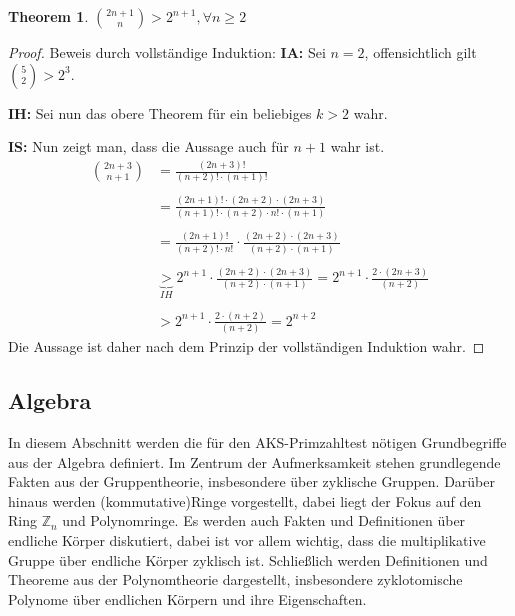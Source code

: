 \documentclass[12pt,oneside]{article}
\newtheorem{theorem}{Theorem}[section]
\theoremstyle{remark}
\theoremstyle{definition}
\begin{document}
\smallskip

\begin{theorem}\label{useful_theorem_for_proof}
${2n + 1 \choose n} > 2^{n+1}, \forall n \geq 2$
\end{theorem}

\begin{proof}
Beweis durch vollständige Induktion:\newline\newline
\textbf{IA: } Sei $n = 2$, offensichtlich gilt ${5 \choose 2} > 2^3$.\newline\newline

\textbf{IH: }Sei nun das obere Theorem für ein beliebiges $k > 2 $ wahr.

\textbf{IS: } Nun zeigt man, dass die Aussage auch für $n + 1$ wahr ist.
\begin{align*}
    {2n +3 \choose n + 1} &= \frac{(2n + 3)!}{(n + 2)! \cdot (n + 1)!} \\
    \\
    &= \frac{(2n + 1)! \cdot (2n + 2) \cdot (2n + 3)}{(n + 1)! \cdot (n + 2) \cdot n! \cdot(n + 1)} \\
    \\
    &= \frac{(2n + 1)!}{(n + 2)! \cdot n!} \cdot \frac{(2n + 2)\cdot (2n + 3)}{(n + 2) \cdot (n + 1)} \\
    \\
     &\underbrace{>}_{IH} 2^{n + 1} \cdot \frac{(2n + 2)\cdot (2n + 3)}{(n + 2) \cdot (n + 1)} = 2^{n + 1} \cdot \frac{2 \cdot (2n + 3)}{(n +2)}\\
     \\
     &> 2^{n + 1} \cdot  \frac{2 \cdot (n + 2)}{(n + 2)} = 2^{n + 2}
\end{align*}
Die Aussage ist daher nach dem Prinzip der vollständigen Induktion wahr.
\end{proof}

\subsection{Algebra}
In diesem Abschnitt werden die für den AKS-Primzahltest nötigen Grundbegriffe aus der Algebra definiert. Im Zentrum der Aufmerksamkeit stehen grundlegende Fakten aus der Gruppentheorie, insbesondere über zyklische Gruppen. Darüber hinaus werden (kommutative)Ringe vorgestellt, dabei liegt der Fokus auf den Ring $\mathbb{Z}_{n}$ und Polynomringe. Es werden auch Fakten und Definitionen über endliche Körper diskutiert, dabei ist vor allem wichtig, dass die multiplikative Gruppe über endliche Körper zyklisch ist. Schließlich werden Definitionen und Theoreme aus der Polynomtheorie dargestellt, insbesondere zyklotomische Polynome über endlichen Körpern und ihre Eigenschaften.
\end{document}
